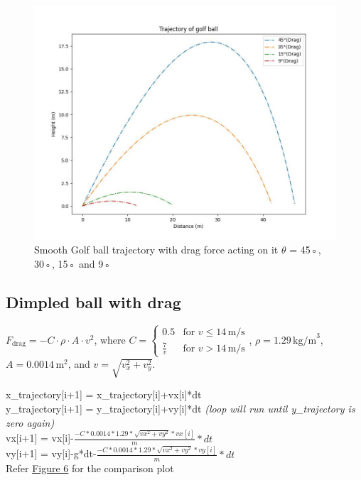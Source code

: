\documentclass[11pt]{article}
\begin{document}
\begin{justify}
\begin{figure}[b]
    \centering
    \includegraphics[width=\textwidth, height=\textheight, keepaspectratio]{Golf_Trajectory_Smooth_Drag.jpeg}
    \caption{Smooth Golf ball trajectory with drag force acting on it $\theta$ = 45◦, 30◦, 15◦ and 9◦}
    \label{fig:Smooth_Fdrag_trajectory}
\end{figure}

\subsection{Dimpled ball with drag}

\( F_{\text{drag}} = -C \cdot \rho \cdot A \cdot v^2 \), where \( C = \begin{cases} 0.5 & \text{for } v \leq 14 \, \text{m/s} \\ \frac{7}{v} & \text{for } v > 14 \, \text{m/s} \end{cases} \), \( \rho = 1.29 \, \text{kg/m}^3 \), \( A = 0.0014 \, \text{m}^2 \), and \( v = \sqrt{v_x^2 + v_y^2} \).
\begin{raggedright}
\begin{justify}
x\_trajectory[i+1] = x\_trajectory[i]+vx[i]*dt\\
y\_trajectory[i+1] = y\_trajectory[i]+vy[i]*dt \textit{(loop will run until y\_trajectory is zero again)}\\
vx[i+1] = vx[i]-$\frac{-C*0.0014*1.29*\sqrt{vx^2+vy^2}*vx[i]}{m}*dt$\\
vy[i+1] = vy[i]-g*dt-$\frac{-C*0.0014*1.29*\sqrt{vx^2+vy^2}*vy[i]}{m}*dt$\\
Refer \hyperref[fig:Dimpled_Fdrag_trajectory]{Figure 6} for the comparison plot
\end{justify}
\end{raggedright}


\end{justify}
\end{document}
